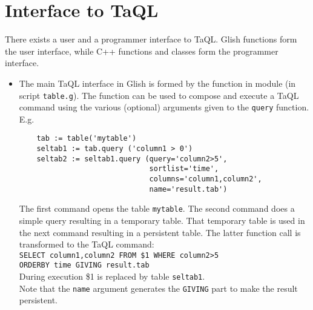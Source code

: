 \section{\label{TAQL:GLISHC}Interface to TaQL}
There exists a user and a programmer interface to TaQL.
Glish functions form the user interface, while C++ functions
and classes form the programmer interface.
\begin{itemize}
\item
  The main TaQL interface in Glish is formed by the
   function in module
   (in script \texttt{table.g}).
  The function can be used
  to compose and execute a TaQL command using the various (optional)
  arguments given to the \texttt{query} function. E.g.
  \begin{verbatim}
    tab := table('mytable')
    seltab1 := tab.query ('column1 > 0')
    seltab2 := seltab1.query (query='column2>5',
                              sortlist='time',
                              columns='column1,column2',
                              name='result.tab')
  \end{verbatim}
  The first command opens the table \texttt{mytable}.
  The second command does a simple query resulting in a temporary
  table. That temporary table is used in the next command resulting in
  a persistent table. The latter function call is transformed to
  the TaQL command:
  \\\texttt{SELECT column1,column2 FROM \$1 WHERE column2>5}
  \\\texttt{ORDERBY time GIVING result.tab}
  \\During execution \$1 is replaced by table \texttt{seltab1}.
  \\Note that the \texttt{name} argument
  generates the \texttt{GIVING} part to make the result persistent.


\end{itemize}
